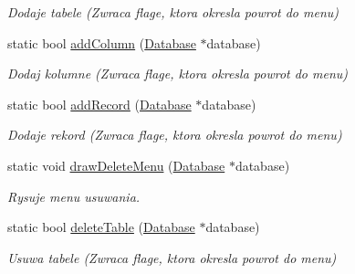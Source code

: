 \begin{DoxyCompactItemize}
\begin{DoxyCompactList}\small\item\em Dodaje tabele (Zwraca flage, ktora okresla powrot do menu) \end{DoxyCompactList}\item 
\mbox{\label{class_operations_a20a8daf97c43a25ee11d4c208c14be3a}} 
static bool \mbox{\hyperlink{class_operations_a20a8daf97c43a25ee11d4c208c14be3a}{add\+Column}} (\mbox{\hyperlink{class_database}{Database}} $\ast$database)
\begin{DoxyCompactList}\small\item\em Dodaj kolumne (Zwraca flage, ktora okresla powrot do menu) \end{DoxyCompactList}\item 
\mbox{\label{class_operations_afd7a5917e3bf9d5400938bdf8b739835}} 
static bool \mbox{\hyperlink{class_operations_afd7a5917e3bf9d5400938bdf8b739835}{add\+Record}} (\mbox{\hyperlink{class_database}{Database}} $\ast$database)
\begin{DoxyCompactList}\small\item\em Dodaje rekord (Zwraca flage, ktora okresla powrot do menu) \end{DoxyCompactList}\item 
\mbox{\label{class_operations_af80abbc0ef95dfe51598e17f090e5025}} 
static void \mbox{\hyperlink{class_operations_af80abbc0ef95dfe51598e17f090e5025}{draw\+Delete\+Menu}} (\mbox{\hyperlink{class_database}{Database}} $\ast$database)
\begin{DoxyCompactList}\small\item\em Rysuje menu usuwania. \end{DoxyCompactList}\item 
\mbox{\label{class_operations_a0264d0eab5834bb2a7c4bd1a3123750b}} 
static bool \mbox{\hyperlink{class_operations_a0264d0eab5834bb2a7c4bd1a3123750b}{delete\+Table}} (\mbox{\hyperlink{class_database}{Database}} $\ast$database)
\begin{DoxyCompactList}\small\item\em Usuwa tabele (Zwraca flage, ktora okresla powrot do menu) \end{DoxyCompactList}\item 
\mbox{\label{class_operations_a131a98d48f81a6795d545c6b5b018aaa}} 

\end{DoxyCompactItemize}

